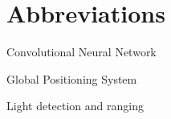 \chapter*{Abbreviations}

\begin{description}
\setlength{\itemsep}{-11pt}
\setlength{\leftmargin}{900pt}

\item[CNN] Convolutional Neural Network

\item[GPS] Global Positioning System

\item[LIDAR] Light detection and ranging

\end{description}
